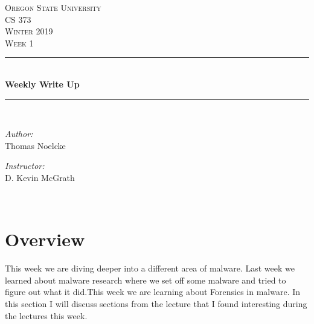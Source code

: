 \documentclass[letterpaper, onecolumn,10pt]{IEEEtran}
\begin{document}
    \begin{titlepage}
    \newcommand{\HRule}{\rule{\linewidth}{0.5mm}}
    \center
    \textsc{\Large Oregon State University}\\[1.5cm]
    \textsc{\Large CS 373}\\[0.5cm]
    \textsc{\Large Winter 2019}\\[0.5cm]
    \textsc{\Large Week 1}\\[0.5cm]
    \HRule \\[0.4cm]
    { \huge \bfseries Weekly Write Up}\\[0.4cm] %
    \HRule \\[1.5cm]
    \begin{minipage}{0.4\textwidth}
        \begin{flushleft} \large
        \emph{Author:}\\
        Thomas Noelcke
        \end{flushleft}
    \end{minipage}
    \begin{minipage}{0.4\textwidth}
        \begin{flushright} \large
        \emph{Instructor:} \\
        D. Kevin McGrath\\
        \end{flushright}
    \end{minipage}\\[2cm]
		\end{titlepage}
		
		
		\section{Overview}
        This week we are diving deeper into a different area of malware. Last week we learned about malware research where we set off some malware and tried to figure out what it did.This week we are learning about Forensics in malware. In this section I will discuss sections from the lecture that I found interesting during the lectures this week.
        
\end{document}
